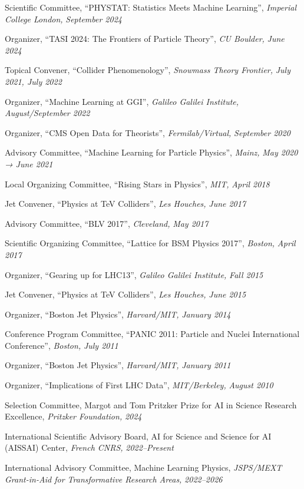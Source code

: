 \item Scientific Committee, ``PHYSTAT: Statistics Meets Machine Learning'', \emph{Imperial College London, }\emph{September 2024}
\item Organizer, ``TASI 2024: The Frontiers of Particle Theory'', \emph{CU Boulder, }\emph{June 2024}
\item Topical Convener, ``Collider Phenomenology'', \emph{Snowmass Theory Frontier, }\emph{July 2021, July 2022}
\item Organizer, ``Machine Learning at GGI'', \emph{Galileo Galilei Institute, }\emph{August/September 2022}
\item Organizer, ``CMS Open Data for Theorists'', \emph{Fermilab/Virtual, }\emph{September 2020}
\item Advisory Committee, ``Machine Learning for Particle Physics'', \emph{Mainz, }\emph{May 2020 → June 2021}
\item Local Organizing Committee, ``Rising Stars in Physics'', \emph{MIT, }\emph{April 2018}
\item Jet Convener, ``Physics at TeV Colliders'', \emph{Les Houches, }\emph{June 2017}
\item Advisory Committee, ``BLV 2017'', \emph{Cleveland, }\emph{May 2017}
\item Scientific Organizing Committee, ``Lattice for BSM Physics 2017'', \emph{Boston, }\emph{April 2017}
\item Organizer, ``Gearing up for LHC13'', \emph{Galileo Galilei Institute, }\emph{Fall 2015}
\item Jet Convener, ``Physics at TeV Colliders'', \emph{Les Houches, }\emph{June 2015}
\item Organizer, ``Boston Jet Physics'', \emph{Harvard/MIT, }\emph{January 2014}
\item Conference Program Committee, ``PANIC 2011: Particle and Nuclei International Conference'', \emph{Boston, }\emph{July 2011}
\item Organizer, ``Boston Jet Physics'', \emph{Harvard/MIT, }\emph{January 2011}
\item Organizer, ``Implications of First LHC Data'', \emph{MIT/Berkeley, }\emph{August 2010}
\item Selection Committee, Margot and Tom Pritzker Prize for AI in Science Research Excellence, \emph{Pritzker Foundation, }\emph{2024}
\item International Scientific Advisory Board, AI for Science and Science for AI (AISSAI) Center, \emph{French CNRS, }\emph{2022--Present}
\item International Advisory Committee, Machine Learning Physics, \emph{JSPS/MEXT Grant-in-Aid for Transformative Research Areas, }\emph{2022--2026}
